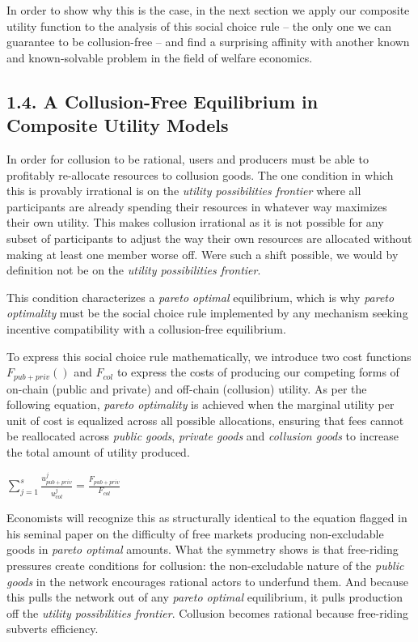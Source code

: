 \documentclass[oneside]{article}   	%
\begin{document}
In order to show why this is the case, in the next section we apply our composite utility function to the analysis of this social choice rule -- the only one we can guarantee to be collusion-free -- and find a surprising affinity with another known and known-solvable problem in the field of welfare economics.


\subsection*{1.4. A Collusion-Free Equilibrium in Composite Utility Models}

In order for collusion to be rational, users and producers must be able to profitably re-allocate resources to collusion goods. The one condition in which this is provably irrational is on the \textit{utility possibilities frontier} where all participants are already spending their resources in whatever way maximizes their own utility. This makes collusion irrational as it is not possible for any subset of participants to adjust the way their own resources are allocated without making at least one member worse off. Were such a shift possible, we would by definition not be on the \textit{utility possibilities frontier}.

This condition characterizes a \textit{pareto optimal} equilibrium, which is why \textit{pareto optimality} must be the social choice rule implemented by any mechanism seeking incentive compatibility with a collusion-free equilibrium.

To express this social choice rule mathematically, we introduce two cost functions $F_{{pub} + {priv}}()$ and $F_{col}$ to express the costs of producing our competing forms of on-chain (public and private) and off-chain (collusion) utility. As per the following equation, \textit{pareto optimality} is achieved when the marginal utility per unit of cost is equalized across all possible allocations, ensuring that fees cannot be reallocated across \textit{public goods}, \textit{private goods} and \textit{collusion goods} to increase the total amount of utility produced.

\LARGE
\begin{adjustwidth}{1.5em}{1.5em}
\begin{math}
\sum_{j=1}^{s} \frac{u_{{pub}+{priv}}^j}{u_{col}^j} = \frac{F_{{pub} + {priv}}}{F_{col}}
\end{math}
\end{adjustwidth}
\normalsize

Economists will recognize this as structurally identical to the equation \cite{samuelson1954pure} flagged in his seminal paper on the difficulty of free markets producing non-excludable goods in \textit{pareto optimal} amounts. What the symmetry shows is that free-riding pressures create conditions for collusion: the non-excludable nature of the \textit{public goods} in the network encourages rational actors to underfund them. And because this pulls the network out of any \textit{pareto optimal} equilibrium, it pulls production off the \textit{utility possibilities frontier}. Collusion becomes rational because free-riding subverts efficiency.
\end{document}
